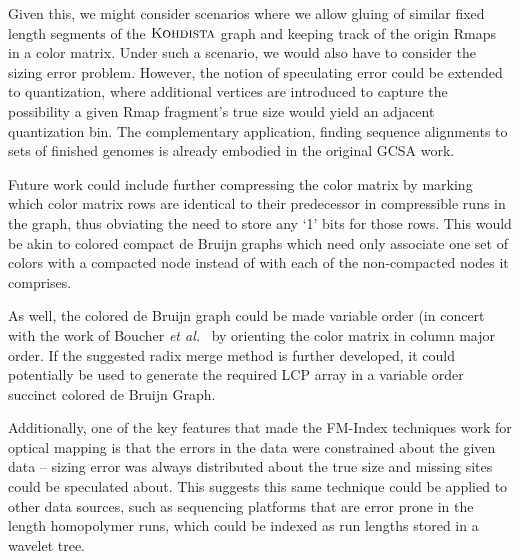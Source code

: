 Given this, we might consider scenarios where we allow gluing of similar fixed length segments of the $\mbox{\rm \textsc{Kohdista}}$ graph and keeping track of the origin Rmaps in a color matrix.  Under such a scenario, we would also have to consider the sizing error problem. However, the notion of speculating error could be extended to quantization, where additional vertices are introduced to capture the possibility a given Rmap fragment's true size would yield an adjacent quantization bin.  The complementary application, finding sequence alignments to sets of finished genomes is already embodied in the original GCSA work.

Future work could include further compressing the color matrix by marking which color matrix rows are identical to their predecessor in compressible runs in the graph, thus obviating the need to store any `1' bits for those rows.  This would be akin to colored compact de Bruijn graphs which need only associate one set of colors with a compacted node instead of with each of the non-compacted nodes it comprises.

As well, the colored de Bruijn graph could be made variable order (in concert with the work of Boucher {\it et al.}~\cite{boucher2015variable} by orienting the color matrix in column major order.  If the suggested radix merge method is further developed, it could potentially be used to generate the required LCP array in a variable order succinct colored de Bruijn Graph.

Additionally, one of the key features that made the FM-Index techniques work for optical mapping is that the errors in the data were constrained about the given data -- sizing error was always distributed about the true size and missing sites could be speculated about.  This suggests this same technique could be applied to other data sources, such as sequencing platforms that are error prone in the length homopolymer runs, which could be indexed  as run lengths stored in a wavelet tree.















